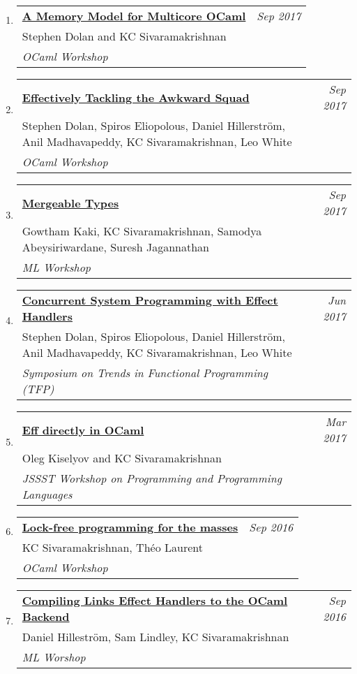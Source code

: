 \documentclass[10pt]{article}
\makeatletter
\newcommand{\lbar}[1]{{\color{#1}\ding{118}}\hspace*{2pt}}
\newenvironment{benumerate}[2]{
    \let\oldItem\item
    \def\item{\addtocounter{enumi}{-2}\oldItem}
    \begin{enumerate}[#2] \itemsep3pt
    \setcounter{enumi}{#1}
    \addtocounter{enumi}{1}}
  {\end{enumerate}}
\newenvironment{publication}[5]
{ \item
  \begin{tabular*}{7.5in}{p{6.3in}@{\extracolsep{\fill}}r}
    \href{#1}{\textbf{#2}} & \textit{#3}\\ #4 &\\ \textit{#5}&\\
  \end{tabular*}
} {}
\newenvironment{region}[3]{%
  \vspace*{0.5ex}
  {\scalebox{1.4}{\textbf{#1}}}
  \begin{benumerate}{#3}{\color{RoyalBlue}#2}}
  {\end{benumerate}\vspace{0.8ex}}
\makeatother
\begin{document}
\begin{region} {\lbar{purple}Workshop Publications}{{W}1}{13}

  \begin{publication}{http://kcsrk.info/papers/memory_model_ocaml17.pdf}
    {A Memory Model for Multicore OCaml}
    {Sep 2017}{Stephen Dolan and KC Sivaramakrishnan}
    {OCaml Workshop}
  \end{publication}

  \begin{publication}{http://kcsrk.info/papers/awkward_effects_ml17.pdf}
    {Effectively Tackling the Awkward Squad}
    {Sep 2017}{Stephen Dolan, Spiros Eliopolous, Daniel Hillerström, Anil Madhavapeddy, KC Sivaramakrishnan, Leo White}
    {OCaml Workshop}
  \end{publication}

  \begin{publication}{http://kcsrk.info/papers/mergeable_types_ml17.pdf}
    {Mergeable Types}
    {Sep 2017}{Gowtham Kaki, KC Sivaramakrishnan, Samodya Abeysiriwardane, Suresh Jagannathan}
    {ML Workshop}
  \end{publication}

  \begin{publication}{http://kcsrk.info/papers/system_effects_may_17.pdf}
    {Concurrent System Programming with Effect Handlers}
    {Jun 2017}{Stephen Dolan, Spiros Eliopolous, Daniel Hillerström, Anil Madhavapeddy, KC Sivaramakrishnan, Leo White}
    {Symposium on Trends in Functional Programming (TFP)}
  \end{publication}

  \begin{publication}{http://kcsrk.info/papers/eff_ocaml_ppl17.pdf}
    {Eff directly in OCaml}
    {Mar 2017}{Oleg Kiselyov and KC Sivaramakrishnan}
    {JSSST Workshop on Programming and Programming Languages}
  \end{publication}

  \begin{publication}{http://kcsrk.info/papers/reagents_ocaml16.pdf}
    {Lock-free programming for the masses}
    {Sep 2016}{KC Sivaramakrishnan, Théo Laurent}
    {OCaml Workshop}
  \end{publication}

  \begin{publication}{http://kcsrk.info/papers/links_ocaml_ml16.pdf}
    {Compiling Links Effect Handlers to the OCaml Backend}
    {Sep 2016}{Daniel Hilleström, Sam Lindley, KC Sivaramakrishnan}
    {ML Worshop}
  \end{publication}


\end{region}
\end{document}
